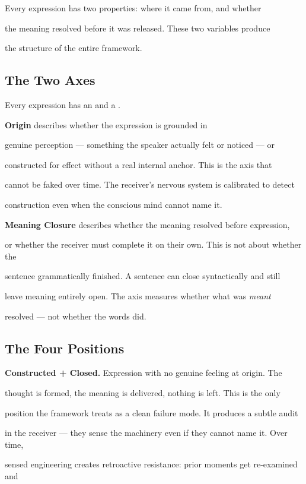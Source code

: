 Every expression has two properties: where it came from, and whether

the meaning resolved before it was released. These two variables produce

the structure of the entire framework.

\subsection{The Two Axes}\label{subsec:origin_and_closure}

Every expression has an  and a .

\textbf{Origin} describes whether the expression is grounded in

genuine perception --- something the speaker actually felt or noticed --- or

constructed for effect without a real internal anchor. This is the axis that

cannot be faked over time. The receiver's nervous system is calibrated to detect

construction even when the conscious mind cannot name it.

\textbf{Meaning Closure} describes whether the meaning resolved before expression,

or whether the receiver must complete it on their own. This is not about whether the

sentence grammatically finished. A sentence can close syntactically and still

leave meaning entirely open. The axis measures whether what was \textit{meant}

resolved --- not whether the words did.

\subsection{The Four Positions}

\textbf{Constructed + Closed.} Expression with no genuine feeling at origin. The

thought is formed, the meaning is delivered, nothing is left. This is the only

position the framework treats as a clean failure mode. It produces a subtle audit

in the receiver --- they sense the machinery even if they cannot name it. Over time,

sensed engineering creates retroactive resistance: prior moments get re-examined and

